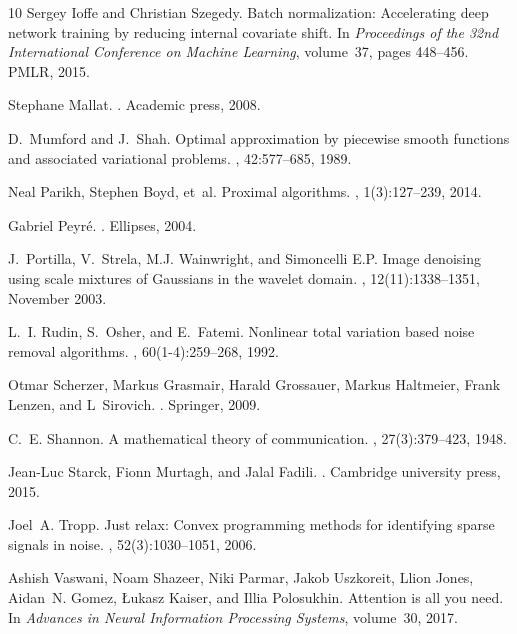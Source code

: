 \begin{thebibliography}{10}
Sergey Ioffe and Christian Szegedy.
\newblock Batch normalization: Accelerating deep network training by reducing
  internal covariate shift.
\newblock In {\em Proceedings of the 32nd International Conference on Machine
  Learning}, volume~37, pages 448--456. PMLR, 2015.

Stephane Mallat.
.
\newblock Academic press, 2008.

D.~Mumford and J.~Shah.
\newblock Optimal approximation by piecewise smooth functions and associated
  variational problems.
, 42:577--685, 1989.

Neal Parikh, Stephen Boyd, et~al.
\newblock Proximal algorithms.
,
  1(3):127--239, 2014.

Gabriel Peyr{\'e}.
.
\newblock Ellipses, 2004.

J.~Portilla, V.~Strela, M.J. Wainwright, and Simoncelli E.P.
\newblock Image denoising using scale mixtures of {Gaussians} in the wavelet
  domain.
, 12(11):1338--1351, November 2003.

L.~I. Rudin, S.~Osher, and E.~Fatemi.
\newblock Nonlinear total variation based noise removal algorithms.
, 60(1-4):259--268, 1992.

Otmar Scherzer, Markus Grasmair, Harald Grossauer, Markus Haltmeier, Frank
  Lenzen, and L~Sirovich.
.
\newblock Springer, 2009.

C.~E. Shannon.
\newblock A mathematical theory of communication.
, 27(3):379--423, 1948.

Jean-Luc Starck, Fionn Murtagh, and Jalal Fadili.
.
\newblock Cambridge university press, 2015.

Joel~A. Tropp.
\newblock Just relax: Convex programming methods for identifying sparse signals
  in noise.
, 52(3):1030--1051,
  2006.

Ashish Vaswani, Noam Shazeer, Niki Parmar, Jakob Uszkoreit, Llion Jones,
  Aidan~N. Gomez, {\L}ukasz Kaiser, and Illia Polosukhin.
\newblock Attention is all you need.
\newblock In {\em Advances in Neural Information Processing Systems},
  volume~30, 2017.

\end{thebibliography}
